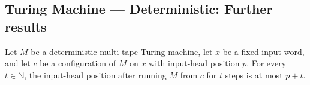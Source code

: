 \subsection*{Turing Machine --- Deterministic: Further results}

\begin{lemma}
\label{Turing.MultiTapeTM.timed_input_bound}
\leanok
{}
Let $M$ be a deterministic multi-tape Turing machine, let $x$ be a fixed input word, and
let $c$ be a configuration of $M$ on $x$ with input-head position $p$. For every
$t\in\mathbb{N}$, the input-head position after running $M$ from $c$ for $t$ steps is at
most $p+t$.
\end{lemma}
